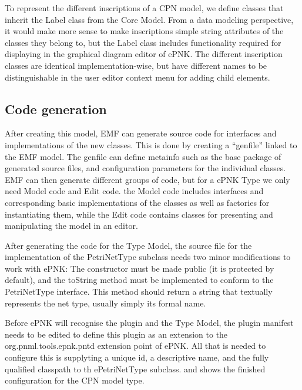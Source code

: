 To represent the different inscriptions of a CPN model, we define classes that
inherit the Label class from the Core Model. From a data modeling
perspective, it would make more sense to make inscriptions simple
string attributes of the classes they belong to, but the Label class includes
functionality required for displaying in the graphical diagram editor of ePNK.
The different inscription classes are identical implementation-wise, but have
different names to be distinguishable in the user editor context menu for adding
child elements.

\subsection{Code generation}
After creating this model, EMF can generate source code for interfaces and
implementations of the new classes. This is done by creating a ``genfile''
linked to the EMF model. The genfile can define metainfo such as the base
package of generated source files, and configuration parameters for the
individual classes. EMF can then generate different groups of code, but for a
ePNK Type we only need Model code and Edit code. the Model code includes
interfaces and corresponding basic implementations of the classes as well as
factories for instantiating them, while the Edit code contains classes for
presenting and manipulating the model in an editor.

After generating the code for the Type Model, the source file for
the implementation of the PetriNetType subclass needs two minor modifications
to work with ePNK: The constructor must be made public (it is protected by
default), and the toString method must be implemented to conform to the
PetriNetType interface. This method should return a string that textually
represents the net type, usually simply its formal name.

Before ePNK will recognise the plugin and the Type Model, the plugin manifest
needs to be edited to define this plugin as an extension to the
org.pnml.tools.epnk.pntd extension point of ePNK. All that is needed to
configure this is supplyting a unique id, a descriptive name, and the fully
qualified classpath to th ePetriNetType subclass.  and
 shows the finished configuration for the CPN model
type. 


